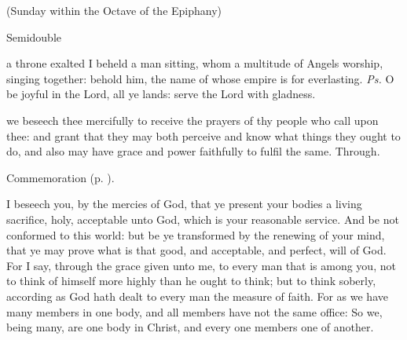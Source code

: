 
\centerline{\small{(Sunday within the Octave of the Epiphany)}}

\fancyhead[RE,LO]{}
\begin{inhead}
{Semidouble}
\end{inhead}


\introit
{} a throne exalted I beheld a man sitting, whom a multitude of Angels worship, singing together: behold him, the name of whose empire is for everlasting. \textit{Ps.} O be joyful in the Lord, all ye lands: serve the Lord with gladness.

\collect
 we beseech thee mercifully to receive the prayers of thy people who call upon thee: and grant that they may both perceive and know what things they ought to do, and also may have grace and power faithfully to fulfil the same. Through.
\begin{rubric}
    Commemoration  (p. \pageref{EpiphanyMassCollect}).
\end{rubric}

 I beseech you, by the mercies of God, that ye present your bodies a living sacrifice, holy, acceptable unto God, which is your reasonable service. And be not conformed to this world: but be ye transformed by the renewing of your mind, that ye may prove what is that good, and acceptable, and perfect, will of God. For I say, through the grace given unto me, to every man that is among you, not to think of himself more highly than he ought to think; but to think soberly, according as God hath dealt to every man the measure of faith. For as we have many members in one body, and all members have not the same office: So we, being many, are one body in Christ, and every one members one of another.


\vspace{-0.25\baselineskip}


